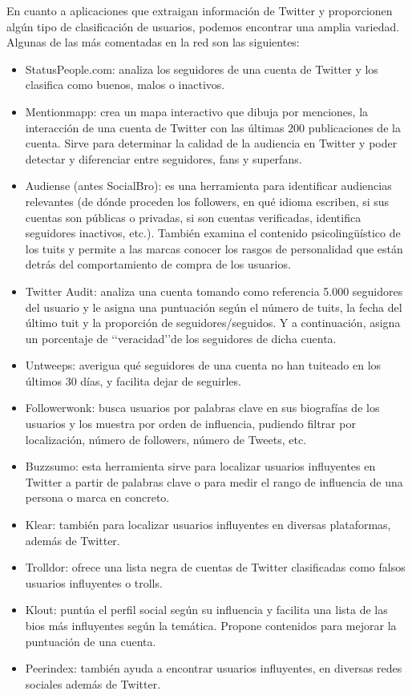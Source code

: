 En cuanto a aplicaciones que extraigan información de Twitter y proporcionen 
algún tipo de clasificación de usuarios, podemos encontrar una amplia variedad.
Algunas de las más comentadas en la red son las siguientes:
\begin{itemize}
\item StatusPeople.com: analiza los seguidores de una cuenta de Twitter y los clasifica como buenos, malos o inactivos.
\item Mentionmapp: crea un mapa interactivo que dibuja por menciones, la interacción de una cuenta de Twitter con las últimas 200 publicaciones de la cuenta. Sirve para determinar la calidad de la audiencia en Twitter y poder detectar y diferenciar entre seguidores, fans y superfans.
\item Audiense (antes SocialBro): es una herramienta para identificar audiencias relevantes (de dónde proceden los followers, en qué idioma escriben, si sus cuentas son públicas o privadas, si son cuentas verificadas, identifica seguidores inactivos, etc.). También examina el contenido psicolingüístico de los tuits y permite a las marcas conocer los rasgos de personalidad que están detrás del comportamiento de compra de los usuarios.
\item Twitter Audit: analiza una cuenta tomando como referencia 5.000 seguidores del usuario y le asigna una puntuación según el número de tuits, la fecha del último tuit y la proporción de seguidores/seguidos. Y a continuación, asigna un porcentaje de \lq\lq veracidad\rq\rq de los seguidores de dicha cuenta.
\item Untweeps: averigua qué seguidores de una cuenta no han tuiteado en los últimos 30 días, y facilita dejar de seguirles.
\item Followerwonk: busca usuarios por palabras clave en sus biografías de los usuarios y los muestra por orden de influencia, pudiendo filtrar por localización, número de followers, número de Tweets, etc. 
\item Buzzsumo: esta herramienta sirve para localizar usuarios influyentes en Twitter a partir de palabras clave o para medir el rango de influencia de una persona o marca en concreto. 
\item Klear: también para localizar usuarios influyentes en diversas plataformas, además de Twitter.
\item Trolldor: ofrece una lista negra de cuentas de Twitter clasificadas como falsos usuarios influyentes o trolls.
\item Klout: puntúa el perfil social según su influencia y facilita una lista de las bios más influyentes según la temática. Propone contenidos para mejorar la puntuación de una cuenta.
\item Peerindex: también ayuda a encontrar usuarios influyentes, en diversas redes sociales además de Twitter.
\end{itemize}

